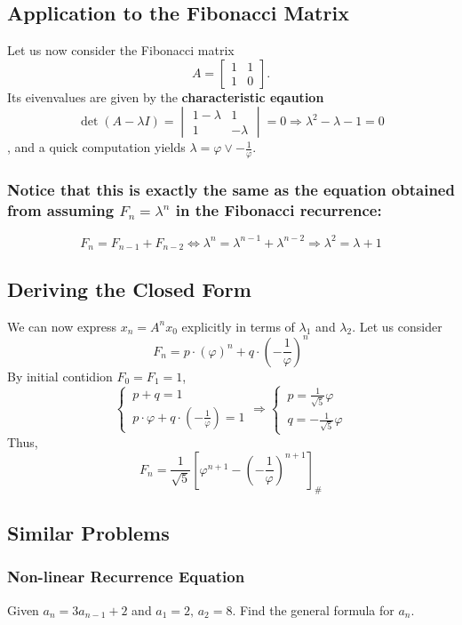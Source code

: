 \documentclass[11pt]{article}
\begin{document}
\subsection{Application to the Fibonacci Matrix}
Let us now consider the Fibonacci matrix
\[
    A = \begin{bmatrix} 1 & 1 \\ 1 & 0 \end{bmatrix}.
\]
Its eivenvalues are given by the \textbf{characteristic eqaution}
\[
    \det(A-\lambda I)=\begin{vmatrix}
        1-\lambda & 1\\1 & -\lambda
    \end{vmatrix}=0 \Rightarrow \boxed{\lambda^2 - \lambda - 1 = 0}
\]
, and a quick computation yields $\displaystyle\lambda = \varphi \lor -\frac{1}{\varphi}$.\\
\subsubsection*{Notice that this is exactly the same as the equation obtained from assuming $F_n = \lambda^n$ in the Fibonacci recurrence:}
\[
    F_n = F_{n-1} + F_{n-2} \Leftrightarrow \lambda^n  = \lambda^{n-1} + \lambda^{n-2} \Rightarrow  \boxed{\lambda^2  = \lambda + 1}
\]
\subsection{Deriving the Closed Form}
We can now express $x_n = A^n x_0$ explicitly in terms of $\lambda_1$ and $\lambda_2$. Let us consider
\[
    F_n=p\cdot(\varphi)^n + q\cdot(-\frac{1}{\varphi})^n
\]
By initial contidion $F_0=F_1=1$, 
\[
    \begin{cases}
        \displaystyle
        \,p+q=1\\
        \displaystyle
        \,p\cdot\varphi + q\cdot (-\frac{1}{\varphi}) = 1
    \end{cases}
    \Rightarrow
    \begin{cases}
        \displaystyle
        \,p=\frac{1}{\sqrt{5}}\varphi\\
        \displaystyle
        \,q=-\frac{1}{\sqrt{5}}\varphi
    \end{cases}
\]
Thus, 
\[
    F_n = \frac{1}{\sqrt{5}}\left[\varphi^{n+1} - (-\frac{1}{\varphi})^{n+1}\right] _\#
\]
\subsection{Similar Problems}
\subsubsection{Non-linear Recurrence Equation}
Given $a_n=3a_{n-1}+2$  and $a_1 = 2,\,a_2 = 8$. Find the general formula for $a_n$. 
\end{document}
